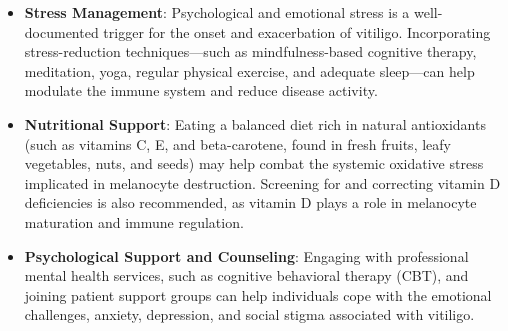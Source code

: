 \begin{itemize}
\begin{itemize}
        \item \textit{Micropigmentation}: Cosmetic tattooing can be used to restore color to stable, small lesions in areas where medical repigmentation is difficult, such as the lips or fingertips. However, it carries a risk of triggering the Koebner phenomenon if the disease is active, and the pigment color may not match changing natural skin tones over time.
    \end{itemize}
    \item \textbf{Stress Management}: Psychological and emotional stress is a well-documented trigger for the onset and exacerbation of vitiligo. Incorporating stress-reduction techniques—such as mindfulness-based cognitive therapy, meditation, yoga, regular physical exercise, and adequate sleep—can help modulate the immune system and reduce disease activity.
    \item \textbf{Nutritional Support}: Eating a balanced diet rich in natural antioxidants (such as vitamins C, E, and beta-carotene, found in fresh fruits, leafy vegetables, nuts, and seeds) may help combat the systemic oxidative stress implicated in melanocyte destruction. Screening for and correcting vitamin D deficiencies is also recommended, as vitamin D plays a role in melanocyte maturation and immune regulation.
    \item \textbf{Psychological Support and Counseling}: Engaging with professional mental health services, such as cognitive behavioral therapy (CBT), and joining patient support groups can help individuals cope with the emotional challenges, anxiety, depression, and social stigma associated with vitiligo.
\end{itemize}

